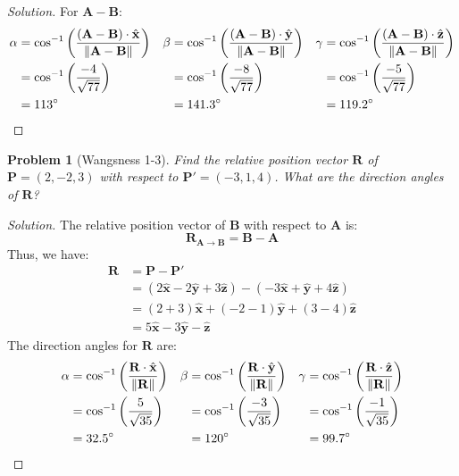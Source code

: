 \documentclass[oneside]{book}
\theoremstyle{mystyle}
\newtheorem{problem}{Problem}[section]
\DeclarePairedDelimiter\norm{\lVert}{\rVert}
\begin{document}
\begin{proof}[Solution]
For $\mathbf{A}-\mathbf{B}$:
\begin{align*}
    \alpha &=\cos^{-1}\bigg(\frac{(\mathbf{A}-\mathbf{B})\cdot\hat{\mathbf{x}}}{\norm{\mathbf{A-B}}}\bigg)&\beta &= \cos^{-1}\bigg(\frac{(\mathbf{A}-\mathbf{B})\cdot\hat{\mathbf{y}}}{\norm{\mathbf{A}-\mathbf{B}}}\bigg) &\gamma&= \cos^{-1}\bigg(\frac{(\mathbf{A}-\mathbf{B})\cdot\hat{\mathbf{z}}}{\norm{\mathbf{A}-\mathbf{B}}}\bigg)\\
    &=\cos^{-1}\bigg(\frac{-4}{\sqrt{77}}\bigg) & &=\cos^{-1}\bigg(\frac{-8}{\sqrt{77}}\bigg) & &=\cos^{-1}\bigg(\frac{-5}{\sqrt{77}}\bigg)\\
    &=113^{\circ} & &=141.3^{\circ} & &=119.2^{\circ}
\end{align*}
\end{proof}
\begin{problem}[Wangsness 1-3]
Find the relative position vector $\mathbf{R}$ of $\mathbf{P}=(2,-2,3)$ with respect to $\mathbf{P}' = (-3,1,4)$. What are the direction angles of $\mathbf{R}$?
\end{problem}
\begin{proof}[Solution]
The relative position vector of $\mathbf{B}$ with respect to $\mathbf{A}$ is:
\begin{equation*}
    \mathbf{R}_{\mathbf{A}\rightarrow \mathbf{B}} = \mathbf{B} -\mathbf{A}
\end{equation*}
Thus, we have:
\begin{align*}
    \mathbf{R} &=\mathbf{P}-\mathbf{P}'\\
    &= (2\hat{\mathbf{x}}-2\hat{\mathbf{y}}+3\hat{\mathbf{z}}) - (-3\hat{\mathbf{x}}+\hat{\mathbf{y}}+4\hat{\mathbf{z}})\\
    &= (2+3)\hat{\mathbf{x}}+(-2-1)\hat{\mathbf{y}}+(3-4)\hat{\mathbf{z}}\\
    &= 5\hat{\mathbf{x}}-3\hat{\mathbf{y}}-\hat{\mathbf{z}}
\end{align*}
The direction angles for $\mathbf{R}$ are:
\begin{align*}
    \alpha &=\cos^{-1}\bigg(\frac{\mathbf{R}\cdot\hat{\mathbf{x}}}{\norm{\mathbf{R}}}\bigg) &\beta&=\cos^{-1}\bigg(\frac{\mathbf{R}\cdot \hat{\mathbf{y}}}{\norm{\mathbf{R}}}\bigg) &\gamma&=\cos^{-1}\bigg(\frac{\mathbf{R}\cdot\hat{\mathbf{z}}}{\norm{\mathbf{R}}}\bigg)\\
    &=\cos^{-1}\bigg(\frac{5}{\sqrt{35}}\bigg) & &=\cos^{-1}\bigg(\frac{-3}{\sqrt{35}}\bigg) & &=\cos^{-1}\bigg(\frac{-1}{\sqrt{35}}\bigg)\\
    &= 32.5^{\circ} & &= 120^{\circ} & &=99.7^{\circ}
\end{align*}
\end{proof}
\end{document}
